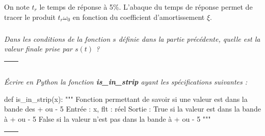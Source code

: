 \documentclass[10pt]{article}
\newif\ifprof
\begin{document}
On note $t_r$  le temps de réponse à 5\%. L'abaque du temps de réponse permet de tracer le produit $t_r\omega_0$ en fonction du coefficient d'amortissement $\xi$.

\subparagraph{}
\textit{Dans les conditions de la fonction $s$ définie dans la partie précédente, quelle est la valeur finale prise par $s(t)$ ?} 
\ifprof
\begin{corrige}
La valeur finale est 1. 
\end{corrige}
\else


\begin{tabular}{|p{}|}
\hline
$$\quad$$ \\
\hline
\end{tabular}
\newpage
\fi


\subparagraph{}
\textit{Écrire en Python la fonction \textsf{\textbf{is\_in\_strip}} ayant les spécifications suivantes : } 
\ifprof
\else

\begin{py}
\begin{python}
def is_in_strip(x):
    """
    Fonction permettant de savoir si une valeur est dans la bande des + ou - 5%
    Entrée : 
        x, flt : réel
    Sortie : 
        True si la valeur est dans la bande à + ou - 5%
        False si la valeur n'est pas dans la bande à + ou - 5%
    """
\end{python}
\end{py}
\fi

\ifprof
\begin{corrige}
\begin{py}
\begin{python}
def is_in_strip(x):
    """
    Fonction permettant de savoir si une valeur est dans la bande des + ou - 5%
    Entrée : 
        x, flt : réel
    Sortie : 
        True si la valeur est dans la bande à + ou - 5%
        False si la valeur n'est pas dans la bande à + ou - 5%
    """
    if x>.95 and x<1.05:
        return True
    else:
        return False
\end{python}
\end{py}
\end{corrige}
\else


\begin{tabular}{|p{}|}
\hline
$$\quad$$
\vspace{2cm}
$$\quad$$ \\
\hline
\end{tabular}
\fi

\ifprof
\else
\vspace{1cm}
\end{document}

